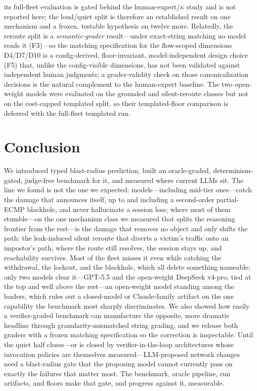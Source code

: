 \documentclass[11pt]{article}
\begin{document}
its full-fleet evaluation is gated behind the human-expert/$\kappa$ study and is
not reported here; the loud/quiet split is therefore an established result on one
mechanism and a frozen, testable hypothesis on twelve more. Relatedly, the reroute split
is a \emph{semantic-grader} result---under exact-string matching no model reads
it (F3)---so the matching specification for the flow-scoped dimensions D4/D7/D10
is a config-derived, floor-invariant, model-independent design choice (F5) that,
unlike the config-visible dimensions, has not been validated against independent
human judgments; a grader-validity check on those canonicalization decisions is
the natural complement to the human-expert baseline. The two open-weight models
were evaluated on the grounded and silent-reroute classes but not on the
cost-capped templated split, so their templated-floor comparison is deferred
with the full-fleet templated run.

\section{Conclusion}
\label{sec:conclusion}

We introduced typed blast-radius prediction, built an oracle-graded,
determinism-gated, judge-free benchmark for it, and measured where current
LLMs sit. The line we found is not the one we expected: models---including
mid-tier ones---catch the damage that announces itself, up to and including
a second-order partial-ECMP blackhole, and never hallucinate a session
loss; where most of them stumble---on the one mechanism class we measured
that splits the reasoning frontier from the rest---is the damage that removes
no object and only shifts the path: the leak-induced silent reroute that
diverts a victim's traffic onto an impostor's path, where the route still
resolves, the session stays up, and reachability survives. Most of the fleet misses it even while catching the withdrawal,
the lockout, and the blackhole, which all delete something nameable; only
two models clear it---GPT-5.5 and the open-weight DeepSeek v4-pro, tied at the
top and well above the rest---an open-weight model standing among the
leaders, which rules out a closed-model or Claude-family artifact on the one
capability the benchmark most sharply discriminates. We
also showed how easily a verifier-graded benchmark can manufacture the
opposite, more dramatic headline through granularity-mismatched string
grading, and we release both graders with a frozen matching specification
so the correction is inspectable. Until the quiet half closes---or is
closed by verifier-in-the-loop architectures whose invocation policies are
themselves measured---LLM-proposed network changes need a blast-radius gate
that the proposing model cannot currently pass on exactly the failures that
matter most. The benchmark, oracle pipeline, run artifacts, and floors make
that gate, and progress against it, measurable.
\end{document}
